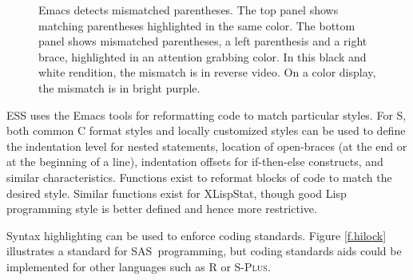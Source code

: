 \documentclass{article}
\newcommand*{\SAS}{\textsc{SAS}}
\newcommand*{\Splus}{\textsc{S-Plus}}
\newcommand{\stexttt}[1]{{\small\texttt{#1}}}
\begin{document}
\begin{figure}[tbp]%
  \caption{Emacs detects mismatched parentheses.  The top panel
    shows matching parentheses highlighted in the same color.  The
    bottom panel shows mismatched parentheses, a left parenthesis and
    a right brace, highlighted in an attention grabbing color.  In
    this black and white rendition, the mismatch is in reverse video.
    On a color display, the mismatch is in bright purple.  }
  \label{f.font}
\end{figure}

ESS uses the Emacs tools for reformatting code to match particular
styles.  For S, both common C format styles and locally customized
styles can be used to define the indentation level for nested
statements, location of open-braces (at the end or at the beginning of
a line), indentation offsets for if-then-else constructs, and similar
characteristics.  Functions exist to reformat blocks of code to match
the desired style.  Similar functions exist for XLispStat, though good
Lisp programming style is better defined and hence more restrictive.

Syntax highlighting can be used to enforce coding standards.  Figure
\ref{f.hilock} illustrates a standard for \SAS\ programming, but
coding standards aids could be implemented for other languages such as
R or \Splus.

\end{document}
